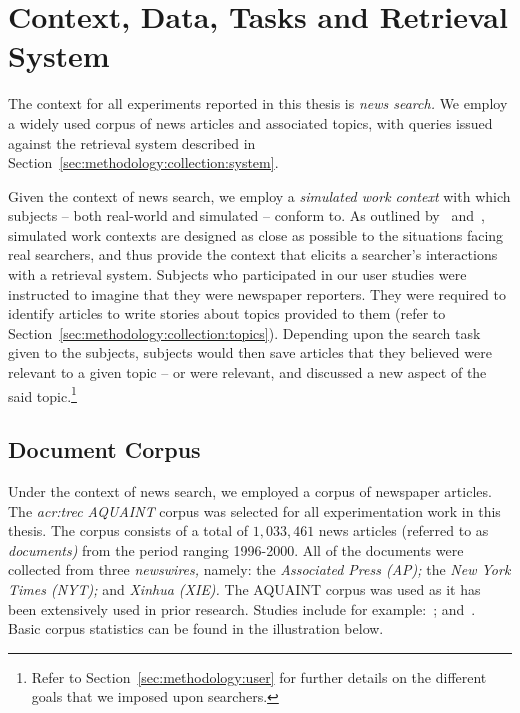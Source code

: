 
\section{Context, Data, Tasks and Retrieval System}\label{sec:methodology:collection}
The context for all experiments reported in this thesis is \emph{news search.} We employ a widely used corpus of news articles and associated topics, with queries issued against the retrieval system described in Section~\ref{sec:methodology:collection:system}.

Given the context of news search, we employ a \emph{simulated work context} with which subjects -- both real-world and simulated -- conform to. As outlined by~\cite{borlund2000simulated_work_tasks} and~\cite{li2013simulated_work_tasks}, simulated work contexts are designed as close as possible to the situations facing real searchers, and thus provide the context that elicits a searcher's interactions with a retrieval system. Subjects who participated in our user studies were instructed to imagine that they were newspaper reporters. They were required to identify articles to write stories about topics provided to them (refer to Section~\ref{sec:methodology:collection:topics}). Depending upon the search task given to the subjects, subjects would then save articles that they believed were relevant to a given topic -- or were relevant, and discussed a new aspect of the said topic.\footnote{Refer to Section~\ref{sec:methodology:user} for further details on the different goals that we imposed upon searchers.}

\subsection{Document Corpus}\label{sec:methodology:collection:corpus}
Under the context of news search, we employed a corpus of newspaper articles. The \emph{\gls{acr:trec} AQUAINT} corpus was selected for all experimentation work in this thesis. The corpus consists of a total of $1,033,461$ news articles (referred to as \emph{documents)} from the period ranging 1996-2000. All of the documents were collected from three \emph{newswires,} namely: the \emph{Associated Press (AP);} the \emph{New York Times (NYT);} and \emph{Xinhua (XIE).} The AQUAINT corpus was used as it has been extensively used in prior research. Studies include for example:~\cite{collinsthompson2004retrieval_quality, ofoghi2006passage_retrieval, baillie2006query_sampling, azzopardi2008retrievability, kelly2009user_study, azzopardi2013query_cost, maxwell2014temporal_delays, harvey2017searching, yang2017can}; and~\cite{wilkie2017bias}. Basic corpus statistics can be found in the illustration below.

